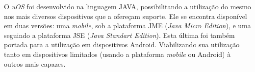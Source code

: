 	O \textit{uOS} foi desenvolvido na linguagem JAVA, possibilitando a utilização do mesmo nos mais
	diversos dispositivos que a ofereçam suporte. Ele se encontra disponível em duas versões: uma
	\textit{mobile}, sob a plataforma JME (\textit{Java Micro Edition}), e uma seguindo a plataforma
	JSE (\textit{Java Standart Edition}). Esta última foi também portada para a utilização em
	dispositivos Android. Viabilizando sua utilização tanto em dispositivos limitados (usando a
	plataforma \textit{mobile} ou Android) à outros mais capazes.
	
